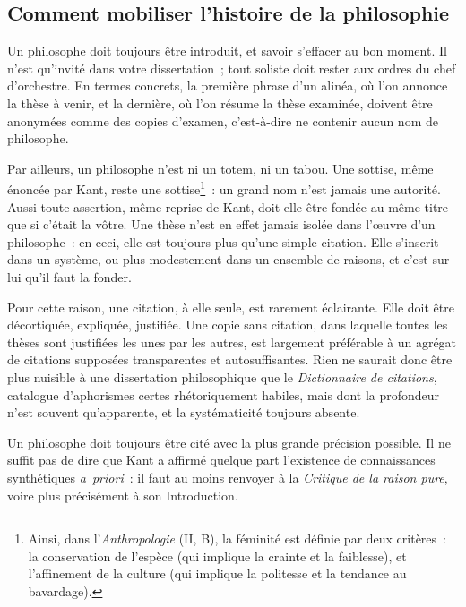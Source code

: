 \documentclass[a4paper,11pt]{article}
\newcommand{\cad}{c'est-à-dire}
\newcommand{\apr}{\emph{a~priori}}
\begin{document}
\subsection{Comment mobiliser l'histoire de la philosophie}

Un philosophe doit toujours être introduit, et savoir s'effacer au bon
moment. Il n'est qu'invité dans votre dissertation~; tout soliste doit
rester aux ordres du chef d'orchestre. En termes concrets, la première
phrase d'un alinéa, où l'on annonce la thèse à venir, et la dernière, où
l'on résume la thèse examinée, doivent être anonymées comme des copies
d'examen, \cad{} ne contenir aucun nom de philosophe. 

\par

Par ailleurs, un philosophe n'est ni un totem, ni un tabou. Une sottise,
même énoncée par Kant, reste une sottise\footnote{Ainsi, dans
  l'\emph{Anthropologie} (II, B), la féminité est définie par deux
  critères~: la conservation de l'espèce (qui implique la crainte et la
  faiblesse), et l'affinement de la culture (qui implique la politesse
  et la tendance au bavardage).}~: un grand nom n'est jamais une
autorité. Aussi toute assertion, même reprise de Kant, doit-elle être
fondée au même titre que si c'était la vôtre.  Une thèse n'est en effet
jamais isolée dans l'œuvre d'un philosophe~: en ceci, elle est toujours
plus qu'une simple citation. Elle s'inscrit dans un système, ou plus
modestement dans un ensemble de raisons, et c'est sur lui qu'il faut la
fonder.

\par

Pour cette raison, une citation, à elle seule, est rarement
éclairante. Elle doit être décortiquée, expliquée, justifiée. Une copie
sans citation, dans laquelle toutes les thèses sont justifiées les unes
par les autres, est largement préférable à un agrégat de citations
supposées transparentes et autosuffisantes. Rien ne saurait donc être
plus nuisible à une dissertation philosophique que le \emph{Dictionnaire
  de citations}, catalogue d'aphorismes certes rhétoriquement habiles,
mais dont la profondeur n'est souvent qu'apparente, et la systématicité
toujours absente.

\par

Un philosophe doit toujours être cité avec la plus grande précision
possible. Il ne suffit pas de dire que Kant a affirmé quelque part
l'existence de connaissances synthétiques \apr{}~: il faut au moins
renvoyer à la \emph{Critique de la raison pure}, voire plus précisément
à son Introduction.
\end{document}
